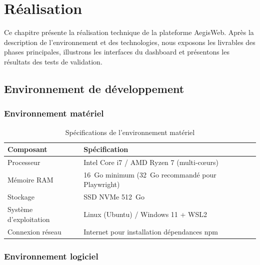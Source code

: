 \chapter{Réalisation}

\begin{chapintro}
Ce chapitre présente la réalisation technique de la plateforme AegisWeb.
Après la description de l'environnement et des technologies, nous exposons
les livrables des phases principales, illustrons les interfaces du
dashboard et présentons les résultats des tests de validation.
\end{chapintro}

\section{Environnement de développement}

\subsection{Environnement matériel}

\begin{table}[H]
\centering
\caption{Spécifications de l'environnement matériel}
\label{tab:materiel}
\begin{tabularx}{\textwidth}{@{}p{4cm}X@{}}
\toprule
\textbf{Composant}       & \textbf{Spécification} \\
\midrule
\rowcolor{rowgray}
Processeur               & Intel Core i7 / AMD Ryzen 7 (multi-cœurs) \\
Mémoire RAM              & 16~Go minimum (32~Go recommandé pour Playwright) \\
\rowcolor{rowgray}
Stockage                 & SSD NVMe 512~Go \\
Système d'exploitation   & Linux (Ubuntu) / Windows 11 + WSL2 \\
\rowcolor{rowgray}
Connexion réseau         & Internet pour installation dépendances npm \\
\bottomrule
\end{tabularx}
\end{table}

\subsection{Environnement logiciel}

